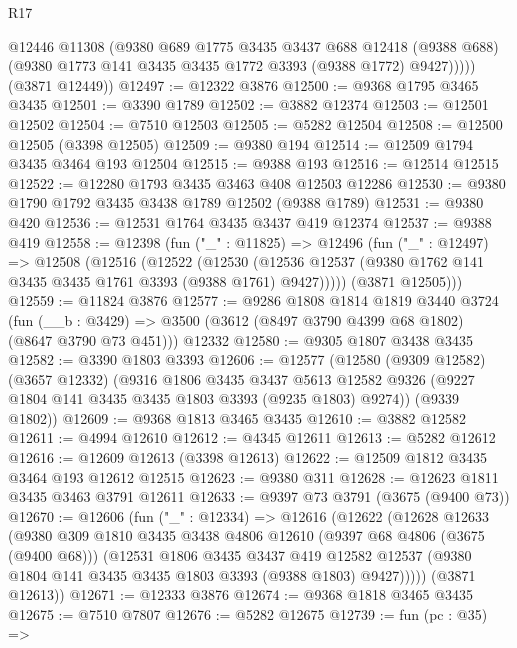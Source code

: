 \begin{lexlean}{R17}
\begin{coremodule}
            @12446
            @11308
            (@9380
              @689
              @1775
              @3435
              @3437
              @688
              @12418
              (@9388 @688)
              (@9380 @1773 @141 @3435 @3435 @1772 @3393 (@9388 @1772) @9427)))))
      (@3871 @12449))
@12497 := @12322 @3876
@12500 := @9368 @1795 @3465 @3435
@12501 := @3390 @1789
@12502 := @3882 @12374
@12503 := @12501 @12502
@12504 := @7510 @12503
@12505 := @5282 @12504
@12508 := @12500 @12505 (@3398 @12505)
@12509 := @9380 @194
@12514 := @12509 @1794 @3435 @3464 @193 @12504
@12515 := @9388 @193
@12516 := @12514 @12515
@12522 := @12280 @1793 @3435 @3463 @408 @12503 @12286
@12530 := @9380 @1790 @1792 @3435 @3438 @1789 @12502 (@9388 @1789)
@12531 := @9380 @420
@12536 := @12531 @1764 @3435 @3437 @419 @12374
@12537 := @9388 @419
@12558 := @12398
    (fun ("_" : @11825) =>
    @12496
      (fun ("_" : @12497) =>
      @12508
        (@12516
          (@12522
            (@12530
              (@12536 @12537 (@9380 @1762 @141 @3435 @3435 @1761 @3393 (@9388 @1761) @9427)))))
        (@3871 @12505)))
@12559 := @11824 @3876
@12577 := @9286
    @1808
    @1814
    @1819
    @3440
    @3724
    (fun (__b : @3429) => @3500 (@3612 (@8497 @3790 @4399 @68 @1802) (@8647 @3790 @73 @451)))
    @12332
@12580 := @9305 @1807 @3438 @3435
@12582 := @3390 @1803 @3393
@12606 := @12577
    (@12580
      (@9309 @12582)
      (@3657 @12332)
      (@9316
        @1806
        @3435
        @3437
        @5613
        @12582
        @9326
        (@9227 @1804 @141 @3435 @3435 @1803 @3393 (@9235 @1803) @9274))
      (@9339 @1802))
@12609 := @9368 @1813 @3465 @3435
@12610 := @3882 @12582
@12611 := @4994 @12610
@12612 := @4345 @12611
@12613 := @5282 @12612
@12616 := @12609 @12613 (@3398 @12613)
@12622 := @12509 @1812 @3435 @3464 @193 @12612 @12515
@12623 := @9380 @311
@12628 := @12623 @1811 @3435 @3463 @3791 @12611
@12633 := @9397 @73 @3791 (@3675 (@9400 @73))
@12670 := @12606
    (fun ("_" : @12334) =>
    @12616
      (@12622
        (@12628
          @12633
          (@9380
            @309
            @1810
            @3435
            @3438
            @4806
            @12610
            (@9397 @68 @4806 (@3675 (@9400 @68)))
            (@12531
              @1806
              @3435
              @3437
              @419
              @12582
              @12537
              (@9380 @1804 @141 @3435 @3435 @1803 @3393 (@9388 @1803) @9427)))))
      (@3871 @12613))
@12671 := @12333 @3876
@12674 := @9368 @1818 @3465 @3435
@12675 := @7510 @7807
@12676 := @5282 @12675
@12739 := fun (pc : @35) =>

\end{coremodule}
\end{lexlean}

